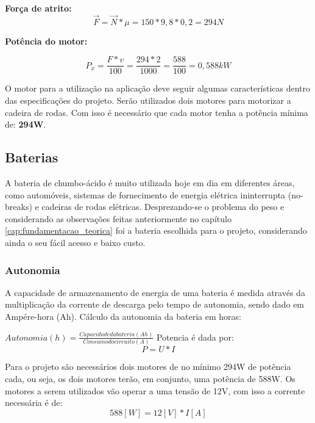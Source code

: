 \textbf{Força de atrito:}
\begin{equation}
 \overrightarrow{F} = \overrightarrow{N} * \mu = 150 * 9,8 * 0,2 = 294N
\end{equation}

\textbf{Potência do motor:}

\begin{equation}
 P_{x} = \frac{F * v}{100} = \frac{294 * 2}{1000} = \frac{588}{100} = 0,588kW
\end{equation}

O motor para a utilização na aplicação deve seguir algumas características dentro das especificações do projeto. Serão utilizados dois motores para motorizar a cadeira de rodas. Com isso é necessário que cada motor tenha a potência mínima de: \textbf{294W}.

\subsection{Baterias}
A bateria de chumbo-ácido é muito utilizada hoje em dia em diferentes áreas,  como automóveis, sistemas de fornecimento de energia elétrica ininterrupta (no-breaks) e cadeiras de rodas elétricas. Desprezando-se o problema do peso e considerando as observações feitas anteriormente no capítulo \ref{cap:fundamentacao_teorica} foi a bateria escolhida para o projeto, considerando ainda o seu fácil acesso e baixo  custo.

\subsubsection{Autonomia}

A capacidade de armazenamento de energia de uma bateria é medida através da multiplicação da corrente de descarga pelo tempo de autonomia, sendo dado em Ampére-hora (Ah). Cálculo da autonomia da bateria em horas:

$Autonomia(h) = \frac{Capacidade da bateria(Ah)}{Consumo do circuito(A)}$
Potencia é dada por:
\begin{equation}
 P=U*I
\end{equation}

Para o projeto são necessários dois motores de no mínimo 294W de potência cada, ou seja, os dois motores terão, em conjunto, uma potência de 588W. Os motores a serem utilizados vão operar a uma tensão de 12V, com isso a corrente necessária é de:
\begin{equation}
588 [W] = 12 [V] * I [A]
\end{equation}

